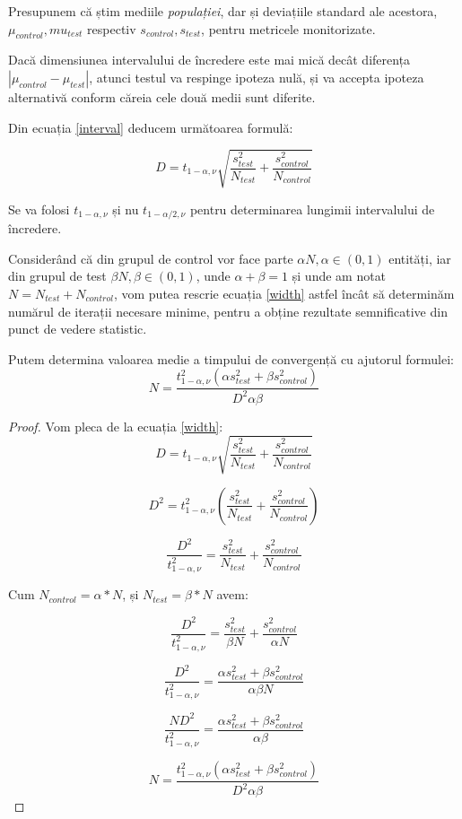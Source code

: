 Presupunem că știm mediile \textit{populației}, dar și deviațiile standard ale acestora, $\mu_{control}, mu_{test}$ respectiv $s_{control}, s_{test}$, pentru metricele monitorizate.

\begin{remark}
	\label{widthobs}
	Dacă dimensiunea intervalului de încredere este mai mică decât diferența $|\mu_{control} - \mu_{test}|$, atunci testul va respinge ipoteza nulă, și va accepta ipoteza alternativă conform căreia cele două medii sunt diferite.
\end{remark}

Din ecuația \ref{interval} deducem următoarea formulă: 

\begin{equation}
\label{width}
D =  t_{1 - \alpha, \nu} \sqrt{ {\frac{s_{test}^2}{N_{test}} }+ {\frac{s_{control}^2}{N_{control}}}}
\end{equation}

\begin{remark}
	Se va folosi $ t_{1 - \alpha, \nu}$ și nu $ t_{1 - \alpha/2, \nu}$ pentru determinarea lungimii intervalului de încredere.
\end{remark}

Considerând că din grupul de control vor face parte $\alpha N, \alpha \in (0, 1)$ entități, iar din grupul de test $\beta N, \beta \in (0, 1)$, unde $\alpha + \beta = 1$ și unde am notat $N = N_{test} + N_{control}$, vom putea rescrie ecuația \ref{width} astfel încât să determinăm numărul de iterații necesare minime, pentru a obține rezultate semnificative din punct de vedere statistic.

\begin{remark}
	Putem determina valoarea medie a timpului de convergență cu ajutorul formulei:
\label{requiredsample}
\[
N =  \frac{
	t_{1 - \alpha, \nu}^2 (\alpha s_{test}^2 + \beta s_{control}^2 )
	}{
	D^2 \alpha \beta
	}
\]
\end{remark}

\begin{proof}
	Vom pleca de la ecuația \ref{width}:
\[
D =  t_{1 - \alpha, \nu} \sqrt{ {\frac{s_{test}^2}{N_{test}} }+ {\frac{s_{control}^2}{N_{control}}}}
\]	

\[
D^2 =  t_{1 - \alpha, \nu}^2 ({\frac{s_{test}^2}{N_{test}} }+ {\frac{s_{control}^2}{N_{control}}})
\]	

\[
\frac{D^2}{ t_{1 - \alpha, \nu}^2 }= {\frac{s_{test}^2}{N_{test}} }+ {\frac{s_{control}^2}{N_{control}}}
\]	

Cum $N_{control} = \alpha * N$, și $N_{test}  = \beta * N$ avem:

\[
\frac{D^2}{ t_{1 - \alpha, \nu}^2 }= {\frac{s_{test}^2}{\beta N} }+ {\frac{s_{control}^2}{\alpha N}}
\]	

\[
\frac{D^2}{ t_{1 - \alpha, \nu}^2 }= \frac{\alpha s_{test}^2 + \beta s_{control}^2}{\alpha \beta N}
\]

\[
\frac{N D^2}{ t_{1 - \alpha, \nu}^2 }= \frac{\alpha s_{test}^2 + \beta s_{control}^2}{\alpha \beta}
\]

\[
N =  \frac{
	t_{1 - \alpha, \nu}^2 (\alpha s_{test}^2 + \beta s_{control}^2 )
}{
D^2 \alpha \beta
}
\]
\end{proof}

